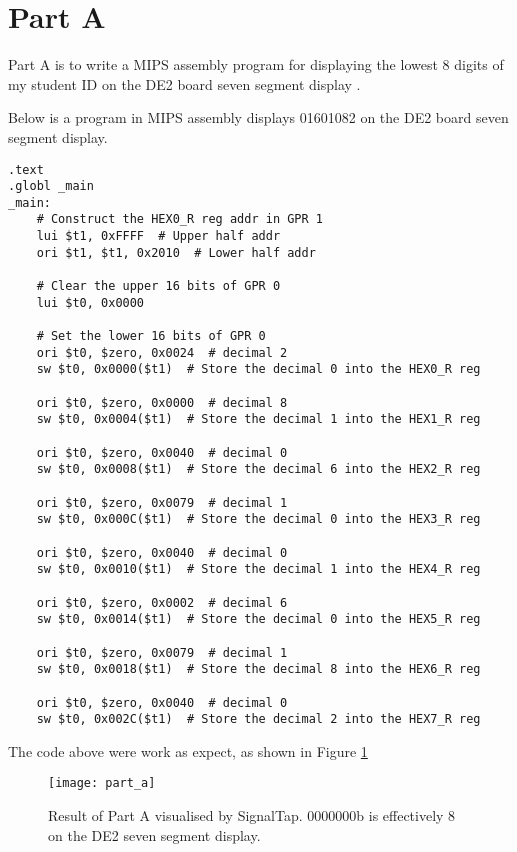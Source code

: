 \newpage
\section{Part A}

Part A is to write a MIPS assembly program for displaying the lowest 8
digits of my student ID on the DE2 board seven segment display \cite{ref:assignment_brief}.

Below is a program in MIPS assembly displays 01601082 on the DE2 board seven segment display.

\begin{verbatim}
.text
.globl _main
_main:
	# Construct the HEX0_R reg addr in GPR 1
	lui $t1, 0xFFFF  # Upper half addr
	ori $t1, $t1, 0x2010  # Lower half addr

	# Clear the upper 16 bits of GPR 0
	lui $t0, 0x0000

	# Set the lower 16 bits of GPR 0
	ori $t0, $zero, 0x0024  # decimal 2
	sw $t0, 0x0000($t1)  # Store the decimal 0 into the HEX0_R reg

	ori $t0, $zero, 0x0000  # decimal 8
	sw $t0, 0x0004($t1)  # Store the decimal 1 into the HEX1_R reg

	ori $t0, $zero, 0x0040  # decimal 0
	sw $t0, 0x0008($t1)  # Store the decimal 6 into the HEX2_R reg

	ori $t0, $zero, 0x0079  # decimal 1
	sw $t0, 0x000C($t1)  # Store the decimal 0 into the HEX3_R reg

	ori $t0, $zero, 0x0040  # decimal 0
	sw $t0, 0x0010($t1)  # Store the decimal 1 into the HEX4_R reg

	ori $t0, $zero, 0x0002  # decimal 6
	sw $t0, 0x0014($t1)  # Store the decimal 0 into the HEX5_R reg

	ori $t0, $zero, 0x0079  # decimal 1
	sw $t0, 0x0018($t1)  # Store the decimal 8 into the HEX6_R reg

	ori $t0, $zero, 0x0040  # decimal 0
	sw $t0, 0x002C($t1)  # Store the decimal 2 into the HEX7_R reg
\end{verbatim}

The code above were work as expect, as shown in Figure \ref{fig:part_a}

\begin{figure}[htbp]
   \centering
   \texttt{[image: part\_a]}
   \caption{Result of Part A visualised by SignalTap. 0000000b is effectively 8 on the DE2 seven segment display.}
   \label{fig:part_a}
\end{figure}

